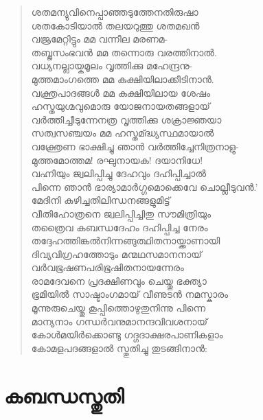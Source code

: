 \begin{verse}
ശതമന്യുവിനെപ്പാഞ്ഞടുത്തേനതിരുഷാ\\
ശതകോടിയാല്‍ തലയറുത്തു ശതമഖന്‍\\
വജ്രമേറ്റിട്ടും മമ വന്നീല മരണമ-\\
തബ്ജസംഭവന്‍ മമ തന്നൊരു വരത്തിനാല്‍.\\
വധ്യനല്ലായ്കമൂലം വൃത്തിക്കു മഹേന്ദ്രനു-\\
മുത്തമാംഗത്തെ മമ കുക്ഷിയിലാക്കീടിനാന്‍.\\
വക്ത്രപാദങ്ങള്‍ മമ കുക്ഷിയിലായ ശേഷം\\
ഹസ്തയുഗ്മവുമൊരു യോജനായതങ്ങളായ്\\
വര്‍ത്തിച്ചീടുന്നേനത്ര വൃത്തിക്കു ശക്രാജ്ഞയാ\\
സത്വസഞ്ചയം മമ ഹസ്തമ്ദ്ധ്യസ്ഥമായാല്‍\\
വക്ത്രേണ ഭാക്ഷിച്ചു ഞാന്‍ വര്‍ത്തിച്ചേനിത്രനാളു-\\
മുത്തമോത്തമ! രഘുനായക! ദയാനിധേ!\\
വഹ്നിയും ജ്വലിപ്പിച്ചു ദേഹവും ദഹിപ്പിച്ചാല്‍\\
പിന്നെ ഞാന്‍ ഭാര്യാമാര്‍ഗ്ഗമൊക്കെവേ ചൊല്ലീടുവന്‍.’\\
മേദിനി കുഴിച്ചതിലിന്ധനങ്ങളുമിട്ട്\\
വീതിഹോത്രനെ ജ്വലിപ്പിച്ചിതു സൗമിത്രിയും\\
തത്രൈവ കബന്ധദേഹം ദഹിപ്പിച്ച നേരം\\
തദ്ദേഹത്തിങ്കല്‍നിന്നങ്ങുത്ഥിതനായ്ക്കാണായി\\
ദിവ്യവിഗ്രഹത്തോടും മന്മഥസമാനനായ്\\
വര്‍വഭൂഷണപരിഭൂഷിതനായന്നേരം\\
രാമദേവനെ പ്രദക്ഷിണവും ചെയ്തു ഭക്ത്യാ\\
ഭൂമിയില്‍ സാഷ്ടാംഗമായ് വീണുടന്‍ നമസ്കാരം\\
മൂന്നുരുചെയ്തു കൂപ്പിത്തൊഴുതുനിന്നു പിന്നെ\\
മാന്യനാം ഗന്ധര്‍വനുമാനന്ദവിവശനായ്\\
കോള്‍മയിര്‍ക്കൊണ്ടു ഗദ്ഗദാക്ഷരപാണികളാം\\
കോമളപദങ്ങളാല്‍ സ്തുതിച്ചു തുടങ്ങിനാന്‍:
\end{verse}

\section{കബന്ധസ്തുതി}

